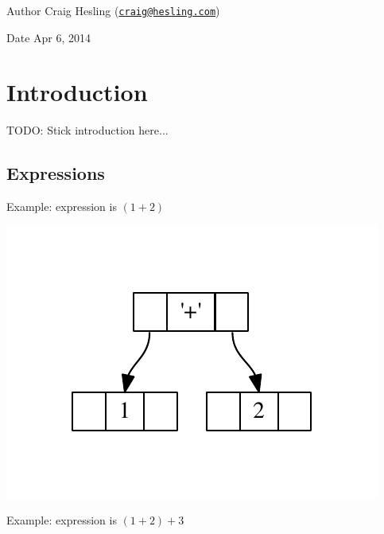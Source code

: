 \begin{DoxyAuthor}{Author}
Craig Hesling (\href{mailto:craig@hesling.com}{\tt craig@hesling.\+com}) 
\end{DoxyAuthor}
\begin{DoxyDate}{Date}
Apr 6, 2014
\end{DoxyDate}
\hypertarget{index_intro_sec}{}\section{Introduction}\label{index_intro_sec}
T\+O\+D\+O\+: Stick introduction here... \hypertarget{index_expressions}{}\subsection{Expressions}\label{index_expressions}
Example\+: expression is $(1 + 2)$

\begin{center}

\begin{DoxyImageNoCaption}
  \mbox{\includegraphics[width=\textwidth,height=\textheight/2,keepaspectratio=true]{dot_inline_dotgraph_2}}
\end{DoxyImageNoCaption}
\end{center}


Example\+: expression is $(1 + 2) + 3$

